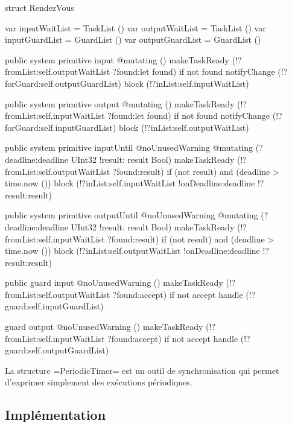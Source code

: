 \begin{PLM}
struct RendezVous {
  var inputWaitList = TaskList ()
  var outputWaitList = TaskList ()
  var inputGuardList = GuardList ()
  var outputGuardList = GuardList ()

  public system primitive input @mutating () {
    makeTaskReady (!?fromList:self.outputWaitList ?found:let found)
    if not found {
      notifyChange (!?forGuard:self.outputGuardList)
      block (!?inList:self.inputWaitList)
    }
  }

  public system primitive output @mutating () {
    makeTaskReady (!?fromList:self.inputWaitList ?found:let found)
    if not found {
      notifyChange (!?forGuard:self.inputGuardList)
      block (!?inList:self.outputWaitList)
    }
  }

  public system primitive
  inputUntil @noUnusedWarning @mutating (?deadline:deadline UInt32
                                         !result: result Bool) {
    makeTaskReady (!?fromList:self.outputWaitList ?found:result)
    if (not result) and (deadline > time.now ()) { 
      block (!?inList:self.inputWaitList !onDeadline:deadline !?result:result)
    }
  }

  public system primitive
  outputUntil @noUnusedWarning @mutating (?deadline:deadline UInt32
                                          !result: result Bool) {
    makeTaskReady (!?fromList:self.inputWaitList ?found:result)
    if (not result) and (deadline > time.now ()) { 
      block (!?inList:self.outputWaitList !onDeadline:deadline !?result:result)
    }
  }

  public guard input @noUnusedWarning () {
    makeTaskReady (!?fromList:self.outputWaitList ?found:accept)
    if not accept {
      handle (!?guard:self.inputGuardList)
    }
  }

  guard output @noUnusedWarning () {
    makeTaskReady (!?fromList:self.inputWaitList ?found:accept)
    if not accept {
      handle (!?guard:self.outputGuardList)
    }
  }

}
\end{PLM}



La structure \plm=PeriodicTimer= est un outil de synchronisation qui permet d'exprimer simplement des exécutions périodiques.


\subsection{Implémentation}

